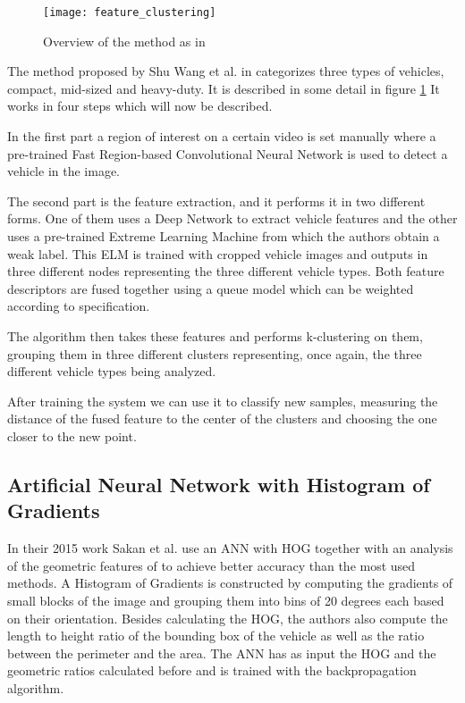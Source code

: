 \begin{figure} [h]
  \begin{center}
  \texttt{[image: feature\_clustering]}
    
    \caption{Overview of the method as in \cite{wang_vehicle_2016}}
\label{fig:feat_cluster}
  \end{center}
\end{figure}

The method proposed by Shu Wang et al. in \citet{wang_vehicle_2016} categorizes three types of vehicles, compact, mid-sized and heavy-duty. It is described in some detail in figure \ref{fig:feat_cluster} It works in four steps which will now be described.

In the first part a region of interest on a certain video is set manually where a pre-trained Fast Region-based Convolutional Neural Network is used to detect a vehicle in the image.

The second part is the feature extraction, and it performs it in two different forms. One of them uses a Deep Network to extract vehicle features and the other uses a pre-trained Extreme Learning Machine from which the authors obtain a weak label. This ELM is trained with cropped vehicle images and outputs in three different nodes representing the three different vehicle types. Both feature descriptors are fused together using a queue model which can be weighted according to specification.

The algorithm then takes these features and performs k-clustering on them, grouping them in three different clusters representing, once again, the three different vehicle types being analyzed.

After training the system we can use it to classify new samples, measuring the distance of the fused feature to the center of the clusters and choosing the one closer to the new point.

\subsection{Artificial Neural Network with Histogram of Gradients}

In their 2015 work \cite{b_traffic_2015} Sakan et al. use an ANN with HOG together with an analysis of the geometric features of to achieve better accuracy than the most used methods. A Histogram of Gradients is constructed by computing the gradients of small blocks of the image and grouping them into bins of 20 degrees each based on their orientation. Besides calculating the HOG, the authors also compute the length to height ratio of the bounding box of the vehicle as well as the ratio between the perimeter and the area. The ANN has as input the HOG and the geometric ratios calculated before and is trained with the backpropagation algorithm.

